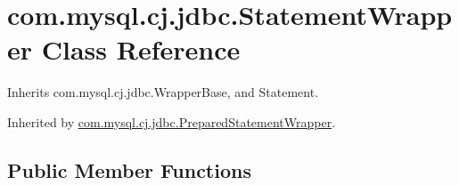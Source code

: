 \hypertarget{classcom_1_1mysql_1_1cj_1_1jdbc_1_1_statement_wrapper}{}\section{com.\+mysql.\+cj.\+jdbc.\+Statement\+Wrapper Class Reference}
\label{classcom_1_1mysql_1_1cj_1_1jdbc_1_1_statement_wrapper}


Inherits com.\+mysql.\+cj.\+jdbc.\+Wrapper\+Base, and Statement.



Inherited by \mbox{\hyperlink{classcom_1_1mysql_1_1cj_1_1jdbc_1_1_prepared_statement_wrapper}{com.\+mysql.\+cj.\+jdbc.\+Prepared\+Statement\+Wrapper}}.

\subsection*{Public Member Functions}
